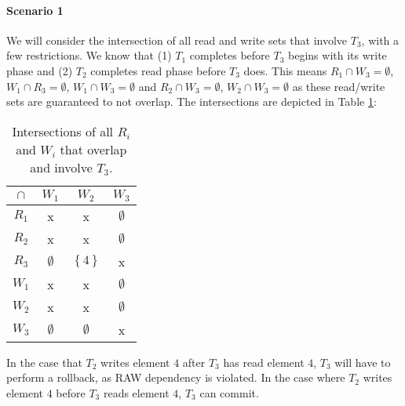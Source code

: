 \documentclass[11pt,a4paper,english]{article}
\begin{document}
\paragraph{Scenario 1}
We will consider the intersection of all read and write sets that involve $T_{3}$, with a few restrictions. We know that (1) $T_{1}$ completes before $T_{3}$ begins with its write phase and (2) $T_{2}$ completes read phase before $T_{3}$ does. This means $R_{1} \cap W_{3} = \emptyset$, $W_{1} \cap R_{3} = \emptyset$, $W_{1} \cap W_{3} = \emptyset$ and $R_{2} \cap W_{3} = \emptyset$, $W_{2} \cap W_{3} = \emptyset$ as these read/write sets are guaranteed to not overlap. The intersections are depicted in Table \ref{tbl:scenario1}:
\begin{table}[!hbt]
\centering
\begin{tabular}{|c|c|c|c|}
\hline
$\cap$  & $W_{1}$ & $W_{2}$ & $W_{3}$    \\ \hline
$R_{1}$ & x  & x  & $\emptyset$ \\ \hline
$R_{2}$ & x  & x  & $\emptyset$ \\ \hline
$R_{3}$ & $\emptyset$ & $\left\{ 4 \right\}$ & x \\ \hline
$W_{1}$ & x  & x  & $\emptyset$ \\ \hline
$W_{2}$ & x  & x  & $\emptyset$ \\ \hline
$W_{3}$ & $\emptyset$ & $\emptyset$ & x \\ \hline
\end{tabular}
\caption{Intersections of all $R_{i}$ and $W_{i}$ that overlap and involve $T_{3}$.}
\label{tbl:scenario1}
\end{table}

In the case that $T_{2}$ writes element $4$ after $T_{3}$ has read element $4$, $T_{3}$ will have to perform a rollback, as RAW dependency is violated. In the case where $T_{2}$ writes element $4$ before $T_{3}$ reads element $4$, $T_{3}$ can commit.
\end{document}
